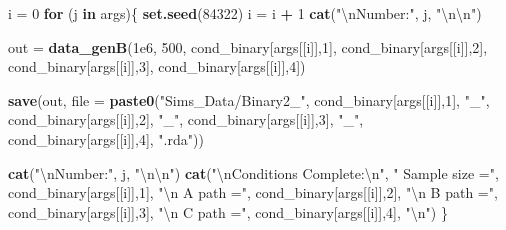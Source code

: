 \documentclass[]{DissertateCUNY}
\newenvironment{Shaded}{\begin{snugshade}}{\end{snugshade}}
\newcommand{\KeywordTok}[1]{\textcolor[rgb]{0.13,0.29,0.53}{\textbf{#1}}}
\newcommand{\DataTypeTok}[1]{\textcolor[rgb]{0.13,0.29,0.53}{#1}}
\newcommand{\DecValTok}[1]{\textcolor[rgb]{0.00,0.00,0.81}{#1}}
\newcommand{\FloatTok}[1]{\textcolor[rgb]{0.00,0.00,0.81}{#1}}
\newcommand{\CharTok}[1]{\textcolor[rgb]{0.31,0.60,0.02}{#1}}
\newcommand{\StringTok}[1]{\textcolor[rgb]{0.31,0.60,0.02}{#1}}
\newcommand{\ControlFlowTok}[1]{\textcolor[rgb]{0.13,0.29,0.53}{\textbf{#1}}}
\newcommand{\OperatorTok}[1]{\textcolor[rgb]{0.81,0.36,0.00}{\textbf{#1}}}
\newcommand{\NormalTok}[1]{#1}
\begin{document}
\begin{Shaded}
\begin{Highlighting}[]
\NormalTok{i =}\StringTok{ }\DecValTok{0}
\ControlFlowTok{for}\NormalTok{ (j }\ControlFlowTok{in}\NormalTok{ args)\{}
  \KeywordTok{set.seed}\NormalTok{(}\DecValTok{84322}\NormalTok{)}
\NormalTok{  i =}\StringTok{ }\NormalTok{i }\OperatorTok{+}\StringTok{ }\DecValTok{1}
  \KeywordTok{cat}\NormalTok{(}\StringTok{"}\CharTok{\textbackslash{}n}\StringTok{Number:"}\NormalTok{, j, }\StringTok{"}\CharTok{\textbackslash{}n\textbackslash{}n}\StringTok{"}\NormalTok{)}
  
\NormalTok{  out =}\StringTok{ }\KeywordTok{data_genB}\NormalTok{(}\FloatTok{1e6}\NormalTok{, }\DecValTok{500}\NormalTok{, }
\NormalTok{                  cond_binary[args[[i]],}\DecValTok{1}\NormalTok{], }
\NormalTok{                  cond_binary[args[[i]],}\DecValTok{2}\NormalTok{], }
\NormalTok{                  cond_binary[args[[i]],}\DecValTok{3}\NormalTok{], }
\NormalTok{                  cond_binary[args[[i]],}\DecValTok{4}\NormalTok{])}
  
  \KeywordTok{save}\NormalTok{(out, }\DataTypeTok{file =} \KeywordTok{paste0}\NormalTok{(}\StringTok{"Sims_Data/Binary2_"}\NormalTok{, }
\NormalTok{                          cond_binary[args[[i]],}\DecValTok{1}\NormalTok{], }\StringTok{"_"}\NormalTok{,}
\NormalTok{                          cond_binary[args[[i]],}\DecValTok{2}\NormalTok{], }\StringTok{"_"}\NormalTok{,}
\NormalTok{                          cond_binary[args[[i]],}\DecValTok{3}\NormalTok{], }\StringTok{"_"}\NormalTok{,}
\NormalTok{                          cond_binary[args[[i]],}\DecValTok{4}\NormalTok{], }\StringTok{".rda"}\NormalTok{))}
  
  \KeywordTok{cat}\NormalTok{(}\StringTok{"}\CharTok{\textbackslash{}n}\StringTok{Number:"}\NormalTok{, j, }\StringTok{"}\CharTok{\textbackslash{}n\textbackslash{}n}\StringTok{"}\NormalTok{)}
  \KeywordTok{cat}\NormalTok{(}\StringTok{"}\CharTok{\textbackslash{}n}\StringTok{Conditions Complete:}\CharTok{\textbackslash{}n}\StringTok{"}\NormalTok{,}
      \StringTok{" Sample size ="}\NormalTok{, cond_binary[args[[i]],}\DecValTok{1}\NormalTok{], }
      \StringTok{"}\CharTok{\textbackslash{}n}\StringTok{  A path      ="}\NormalTok{, cond_binary[args[[i]],}\DecValTok{2}\NormalTok{], }
      \StringTok{"}\CharTok{\textbackslash{}n}\StringTok{  B path      ="}\NormalTok{, cond_binary[args[[i]],}\DecValTok{3}\NormalTok{], }
      \StringTok{"}\CharTok{\textbackslash{}n}\StringTok{  C path      ="}\NormalTok{, cond_binary[args[[i]],}\DecValTok{4}\NormalTok{], }\StringTok{"}\CharTok{\textbackslash{}n}\StringTok{"}\NormalTok{)}
\NormalTok{\}}
\end{Highlighting}
\end{Shaded}
\end{document}
